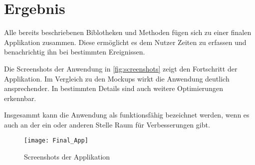 \section{Ergebnis}
Alle bereits beschriebenen Biblotheken und Methoden fügen sich zu einer finalen Applikation zusammen.
Diese ermöglicht es dem Nutzer Zeiten zu erfassen und benachrichtig ihn bei bestimmten Ereignissen.

Die Screenshots der Anwendung in \autoref{fig:screenshots} zeigt den Fortschritt der Applikation.
Im Vergleich zu den Mockups wirkt die Anwendung deutlich ansprechender.
In bestimmten Details sind auch weitere Optimierungen erkennbar.

Insgesammt kann die Anwendung als funktionsfähig bezeichnet werden,
wenn es auch an der ein oder anderen Stelle Raum für Verbesserungen gibt.

\begin{figure}[h]
    \centering
    \texttt{[image: Final\_App]}
    \caption{Screenshots der Applikation}
    \label{fig:screenshots}
\end{figure}